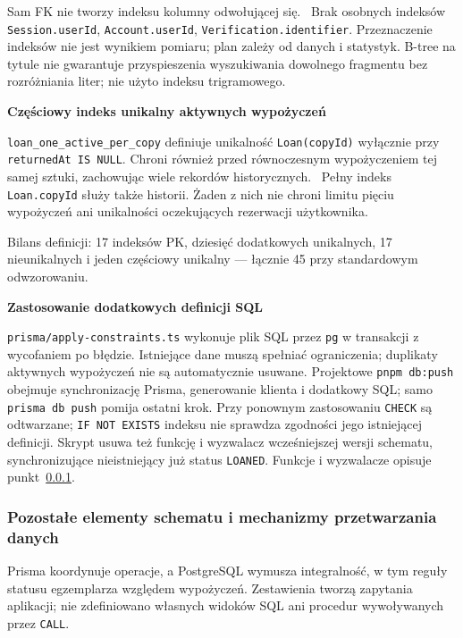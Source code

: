 \documentclass[11pt, a4paper]{article}
\begin{document}
Sam FK nie tworzy indeksu kolumny odwołującej się.~\cite{postgres-constraints} Brak osobnych indeksów \texttt{Session.\allowbreak userId}, \texttt{Account.\allowbreak userId}, \texttt{Verification.\allowbreak identifier}. Przeznaczenie indeksów nie jest wynikiem pomiaru; plan zależy od danych i statystyk. B-tree na tytule nie gwarantuje przyspieszenia wyszukiwania dowolnego fragmentu bez rozróżniania liter; nie użyto indeksu trigramowego.

\noindent\textbf{Częściowy indeks unikalny aktywnych wypożyczeń}

\texttt{loan\_one\_active\_per\_copy} definiuje unikalność \texttt{Loan(copyId)} wyłącznie przy \texttt{returnedAt IS NULL}. Chroni również przed równoczesnym wypożyczeniem tej samej sztuki, zachowując wiele rekordów historycznych.~\cite{postgres-partial} Pełny indeks \texttt{Loan.copyId} służy także historii. Żaden z nich nie chroni limitu pięciu wypożyczeń ani unikalności oczekujących rezerwacji użytkownika.

Bilans definicji: 17 indeksów PK, dziesięć dodatkowych unikalnych, 17 nieunikalnych i jeden częściowy unikalny --- łącznie 45 przy standardowym odwzorowaniu.

\noindent\textbf{Zastosowanie dodatkowych definicji SQL}

\texttt{prisma/apply-constraints.ts} wykonuje plik SQL przez \texttt{pg} w transakcji z wycofaniem po błędzie. Istniejące dane muszą spełniać ograniczenia; duplikaty aktywnych wypożyczeń nie są automatycznie usuwane. Projektowe \texttt{pnpm db:push} obejmuje synchronizację Prisma, generowanie klienta i dodatkowy SQL; samo \texttt{prisma db push} pomija ostatni krok. Przy ponownym zastosowaniu \texttt{CHECK} są odtwarzane; \texttt{IF NOT EXISTS} indeksu nie sprawdza zgodności jego istniejącej definicji. Skrypt usuwa też funkcję i wyzwalacz wcześniejszej wersji schematu, synchronizujące nieistniejący już status \texttt{LOANED}. Funkcje i wyzwalacze opisuje punkt~\ref{subsec:przetwarzanie-danych}.

\subsubsection{Pozostałe elementy schematu i mechanizmy przetwarzania danych}
\label{subsec:przetwarzanie-danych}

Prisma koordynuje operacje, a PostgreSQL wymusza integralność, w tym reguły statusu egzemplarza względem wypożyczeń. Zestawienia tworzą zapytania aplikacji; nie zdefiniowano własnych widoków SQL ani procedur wywoływanych przez \texttt{CALL}.
\end{document}
